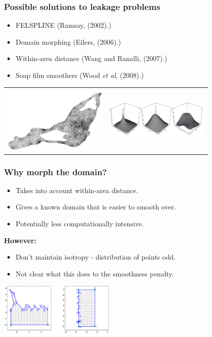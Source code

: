 \documentclass[ignorenonframetext]{beamer} %
\newcommand{\bc}{\begin{center}}
\newcommand{\ec}{\end{center}}
\newcommand{\bi}{\begin{itemize}}
\newcommand{\ei}{\end{itemize}}
\begin{document}
\begin{frame}
	\frametitle{Possible solutions to leakage problems}
       \bi
         \item FELSPLINE (Ramsay, (2002).)
         \item Domain morphing (Eilers, (2006).)
         \item Within-area distance (Wang and Ranalli, (2007).)
         \item Soap film smoothers (Wood \emph{et al}, (2008).) 
        \ei
        \bc\begin{tabular}{@{}cc}
          & \\
        \includegraphics[width=2in]{figs/ramsaytriangulation.png}&\includegraphics[width=2in]{figs/soapbases.png}\\
        \end{tabular}
        \ec
\end{frame}

\begin{frame}
	\frametitle{Why morph the domain?}
      \bi
         \item Takes into account within-area distance.
         \item Gives a known domain that is easier to smooth over.
         \item Potentially less computationally intensive. 
      \ei
      \bc
         \textbf{However:}
      \ec
      \bi
         \item Don't maintain isotropy - distribution of points odd.
         \item Not clear what this does to the smoothness penalty.
      \ei
      \bc
         \includegraphics[height=1in]{figs/matlab-test-3}
      \ec
\end{frame}
\end{document}
